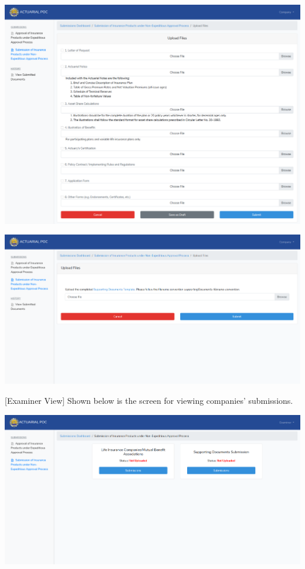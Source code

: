 \documentclass{article}
\begin{document}
\includegraphics[keepaspectratio=true]{up-ic-screens/image173}{}%

\includegraphics[keepaspectratio=true]{up-ic-screens/image214}{}%

[Examiner View] Shown below is the screen for viewing
companies’ submissions.%

\includegraphics[keepaspectratio=true]{up-ic-screens/image24}{}%
\end{document}
